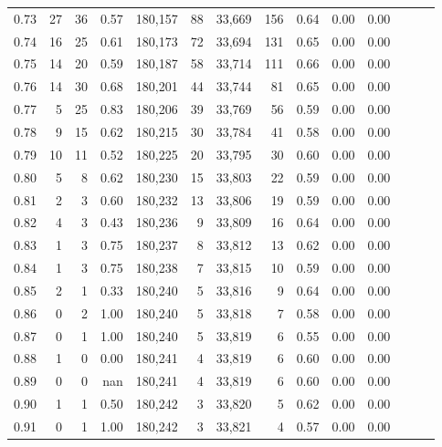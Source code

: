 \begin{tabular}{rrrrrrrrrrrrrr}
0.73 &     27 &     36 &  0.57 &  180,157 &       88 &  33,669 &     156 &  0.64 &  0.00 &      0.00 \\
0.74 &     16 &     25 &  0.61 &  180,173 &       72 &  33,694 &     131 &  0.65 &  0.00 &      0.00 \\
0.75 &     14 &     20 &  0.59 &  180,187 &       58 &  33,714 &     111 &  0.66 &  0.00 &      0.00 \\
0.76 &     14 &     30 &  0.68 &  180,201 &       44 &  33,744 &      81 &  0.65 &  0.00 &      0.00 \\
0.77 &      5 &     25 &  0.83 &  180,206 &       39 &  33,769 &      56 &  0.59 &  0.00 &      0.00 \\
0.78 &      9 &     15 &  0.62 &  180,215 &       30 &  33,784 &      41 &  0.58 &  0.00 &      0.00 \\
0.79 &     10 &     11 &  0.52 &  180,225 &       20 &  33,795 &      30 &  0.60 &  0.00 &      0.00 \\
0.80 &      5 &      8 &  0.62 &  180,230 &       15 &  33,803 &      22 &  0.59 &  0.00 &      0.00 \\
0.81 &      2 &      3 &  0.60 &  180,232 &       13 &  33,806 &      19 &  0.59 &  0.00 &      0.00 \\
0.82 &      4 &      3 &  0.43 &  180,236 &        9 &  33,809 &      16 &  0.64 &  0.00 &      0.00 \\
0.83 &      1 &      3 &  0.75 &  180,237 &        8 &  33,812 &      13 &  0.62 &  0.00 &      0.00 \\
0.84 &      1 &      3 &  0.75 &  180,238 &        7 &  33,815 &      10 &  0.59 &  0.00 &      0.00 \\
0.85 &      2 &      1 &  0.33 &  180,240 &        5 &  33,816 &       9 &  0.64 &  0.00 &      0.00 \\
0.86 &      0 &      2 &  1.00 &  180,240 &        5 &  33,818 &       7 &  0.58 &  0.00 &      0.00 \\
0.87 &      0 &      1 &  1.00 &  180,240 &        5 &  33,819 &       6 &  0.55 &  0.00 &      0.00 \\
0.88 &      1 &      0 &  0.00 &  180,241 &        4 &  33,819 &       6 &  0.60 &  0.00 &      0.00 \\
0.89 &      0 &      0 &   nan &  180,241 &        4 &  33,819 &       6 &  0.60 &  0.00 &      0.00 \\
0.90 &      1 &      1 &  0.50 &  180,242 &        3 &  33,820 &       5 &  0.62 &  0.00 &      0.00 \\
0.91 &      0 &      1 &  1.00 &  180,242 &        3 &  33,821 &       4 &  0.57 &  0.00 &      0.00 \\

\end{tabular}
